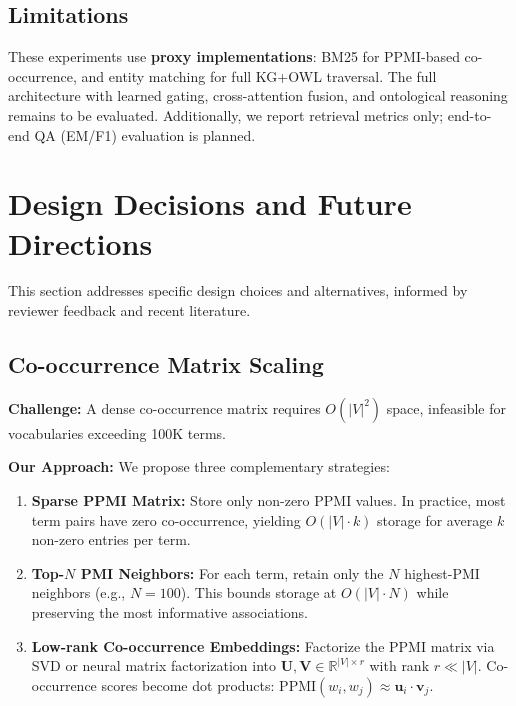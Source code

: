 \documentclass[11pt,a4paper]{article}
\begin{document}
\subsection{Limitations}

These experiments use \textbf{proxy implementations}: BM25 for PPMI-based co-occurrence, and entity matching for full KG+OWL traversal. The full architecture with learned gating, cross-attention fusion, and ontological reasoning remains to be evaluated. Additionally, we report retrieval metrics only; end-to-end QA (EM/F1) evaluation is planned.

\section{Design Decisions and Future Directions}
\label{sec:design_decisions}

This section addresses specific design choices and alternatives, informed by reviewer feedback and recent literature.

\subsection{Co-occurrence Matrix Scaling}
\label{sec:cooccurrence_scaling}

\textbf{Challenge:} A dense co-occurrence matrix requires $O(|V|^2)$ space, infeasible for vocabularies exceeding 100K terms.

\textbf{Our Approach:} We propose three complementary strategies:

\begin{enumerate}
    \item \textbf{Sparse PPMI Matrix:} Store only non-zero PPMI values. In practice, most term pairs have zero co-occurrence, yielding $O(|V| \cdot k)$ storage for average $k$ non-zero entries per term.
    
    \item \textbf{Top-$N$ PMI Neighbors:} For each term, retain only the $N$ highest-PMI neighbors (e.g., $N = 100$). This bounds storage at $O(|V| \cdot N)$ while preserving the most informative associations.
    
    \item \textbf{Low-rank Co-occurrence Embeddings:} Factorize the PPMI matrix via SVD or neural matrix factorization into $\mathbf{U}, \mathbf{V} \in \mathbb{R}^{|V| \times r}$ with rank $r \ll |V|$. Co-occurrence scores become dot products: $\text{PPMI}(w_i, w_j) \approx \mathbf{u}_i \cdot \mathbf{v}_j$.
\end{enumerate}
\end{document}
